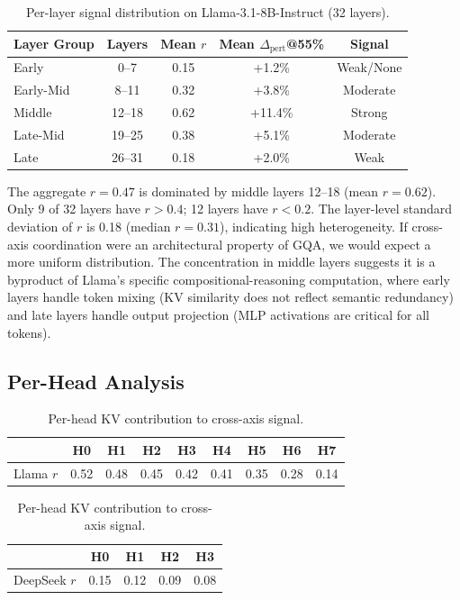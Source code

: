 \documentclass[11pt]{article}
\begin{document}
\begin{table}[h]
\centering
\caption{Per-layer signal distribution on Llama-3.1-8B-Instruct (32 layers).}
\label{tab:perlayer}
\small
\begin{tabular}{@{}lcccc@{}}
\toprule
Layer Group & Layers & Mean $r$ & Mean $\Delta_\text{pert}$@55\% & Signal \\
\midrule
Early & 0--7 & 0.15 & +1.2\% & Weak/None \\
Early-Mid & 8--11 & 0.32 & +3.8\% & Moderate \\
Middle & 12--18 & 0.62 & +11.4\% & Strong \\
Late-Mid & 19--25 & 0.38 & +5.1\% & Moderate \\
Late & 26--31 & 0.18 & +2.0\% & Weak \\
\bottomrule
\end{tabular}
\end{table}

The aggregate $r{=}0.47$ is dominated by middle layers 12--18 (mean $r{=}0.62$). Only 9 of 32 layers have $r{>}0.4$; 12 layers have $r{<}0.2$. The layer-level standard deviation of $r$ is 0.18 (median $r{=}0.31$), indicating high heterogeneity. If cross-axis coordination were an architectural property of GQA, we would expect a more uniform distribution. The concentration in middle layers suggests it is a byproduct of Llama's specific compositional-reasoning computation, where early layers handle token mixing (KV similarity does not reflect semantic redundancy) and late layers handle output projection (MLP activations are critical for all tokens).

\subsection{Per-Head Analysis}

\begin{table}[h]
\centering
\caption{Per-head KV contribution to cross-axis signal.}
\label{tab:perhead}
\small
\begin{tabular}{@{}lcccccccc@{}}
\toprule
& H0 & H1 & H2 & H3 & H4 & H5 & H6 & H7 \\
\midrule
Llama $r$ & 0.52 & 0.48 & 0.45 & 0.42 & 0.41 & 0.35 & 0.28 & 0.14 \\
\bottomrule
\end{tabular}
\vspace{2pt}
\begin{tabular}{@{}lcccc@{}}
\toprule
& H0 & H1 & H2 & H3 \\
\midrule
DeepSeek $r$ & 0.15 & 0.12 & 0.09 & 0.08 \\
\bottomrule
\end{tabular}
\end{table}
\end{document}
